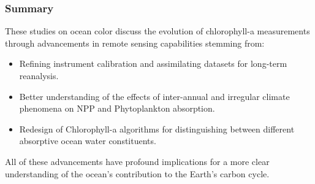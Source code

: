 \begin{frame}\frametitle{Summary} 

  These studies on ocean color discuss the evolution of chlorophyll-a measurements through advancements in remote sensing capabilities stemming from:
  \begin{itemize}
    \item Refining instrument calibration and assimilating datasets for long-term reanalysis.
    \item Better understanding of the effects of inter-annual and irregular climate phenomena on NPP and Phytoplankton absorption.
    \item Redesign of Chlorophyll-a algorithms for distinguishing between different absorptive ocean water constituents. 
  \end{itemize}
  All of these advancements have profound implications for a more clear understanding of the ocean's contribution to the Earth's carbon cycle.
\end{frame}

